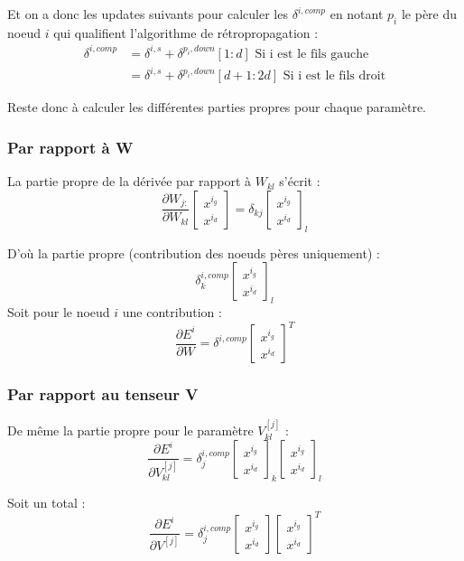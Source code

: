 \documentclass[conference]{IEEEtran}
\begin{document}
Et on a donc les updates suivants pour calculer les $\delta^{i,comp}$ en notant $p_i$ le père du noeud $i$ qui qualifient l'algorithme de rétropropagation :
\begin{align*}
\delta^{i,comp}&=\delta^{i,s}+\delta^{p_i,down}[1:d] \mbox{ Si i est le fils gauche}\\
&=\delta^{i,s}+\delta^{p_i,down}[d+1:2d] \mbox{ Si i est le fils droit}
\end{align*}

Reste donc à calculer les différentes parties propres pour chaque paramètre.

\subsubsection{Par rapport à W}
La partie propre de la dérivée par rapport à $W_{kl}$ s'écrit :
$$\frac{\partial W_{j:}}{\partial W_{kl}}\begin{bmatrix} x^{i_g} \\ x^{i_d} \end{bmatrix}=\delta_{kj}\begin{bmatrix} x^{i_g} \\ x^{i_d} \end{bmatrix}_l$$

D'où la partie propre (contribution des noeuds pères uniquement) : 
$$\delta^{i,comp}_k \begin{bmatrix} x^{i_g} \\ x^{i_d} \end{bmatrix}_l$$
Soit pour le noeud $i$ une contribution :
$$\frac{\partial E^i}{\partial W}=\delta^{i,comp} \begin{bmatrix} x^{i_g} \\ x^{i_d} \end{bmatrix}^T$$

\subsubsection{Par rapport au tenseur V}
De même la partie propre pour le paramètre $V^{[j]}_{kl}$ :
$$\frac{\partial E^i}{\partial V^{[j]}_{kl}} = \delta_j^{i,comp}\begin{bmatrix} x^{i_g} \\ x^{i_d} \end{bmatrix}_k\begin{bmatrix} x^{i_g} \\ x^{i_d} \end{bmatrix}_l$$

Soit un total :
$$\frac{\partial E^i}{\partial V^{[j]}} = \delta_j^{i,comp}\begin{bmatrix} x^{i_g} \\ x^{i_d} \end{bmatrix}\begin{bmatrix} x^{i_g} \\ x^{i_d} \end{bmatrix}^T$$
\end{document}
